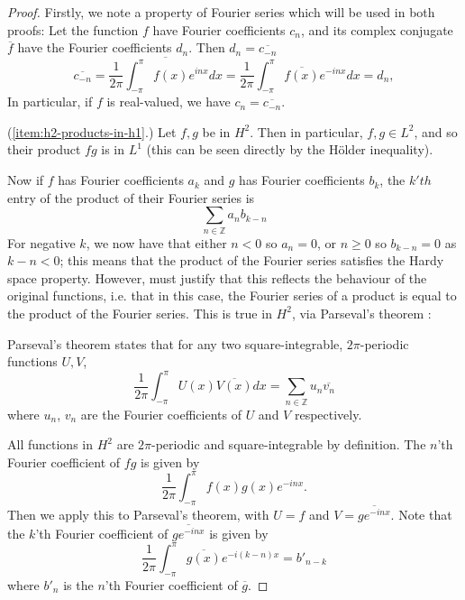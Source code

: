 \documentclass[../main.tex]{subfiles}
\begin{document}
\begin{proof}
  Firstly, we note a property of Fourier series which will be used in both proofs:
  Let the function $f$ have Fourier coefficients $c_n$, and its complex conjugate
  $\overline{f}$ have the Fourier coefficients $d_n$. Then $d_n = \overline{c_{-n}}$
  \begin{equation}
  \label{eqn:fourier-conjugates}
    \overline{c_{-n}} = \overline{\frac{1}{2\pi} \int_{-\pi}^{\pi}  f(x) e^{inx} dx} 
		    = \frac{1}{2\pi} \int_{-\pi}^{\pi} \overline{f(x)} e^{-inx} dx
        = d_n,
  \end{equation}
  In particular, if $f$ is real-valued, we have $c_n = \overline{c_{-n}}$.

  (\ref{item:h2-products-in-h1}.) Let $f, g$ be in $H^2$. Then in particular, $f,
  g \in L^2$, and so their product $fg$ is in $L^1$ (this can be seen
  directly by the H\"older inequality).

  Now if $f$ has Fourier coefficients $a_k$ and $g$ has Fourier coefficients $b_k$,
  the $k'th$ entry of the product of their Fourier series is
  \begin{equation}
  \label{eqn:prod-fourier-series}
    \sum_{n \in \mathbb{Z}} a_n b_{k-n}
  \end{equation}
  For negative $k$, 
  we now have that either $n < 0$ so $a_n = 0$, or $n \geq 0$ so $b_{k-n} = 0$
  as $k-n < 0$; this means that the product of the Fourier series satisfies
  the Hardy space property. However, must justify that this reflects the behaviour
  of the original functions, i.e. that in this case, the Fourier series of a product
  is equal to the product of the Fourier series. This is true in $H^2$, via
  Parseval's theorem \cite{halmos1982hilbert}:
  
  Parseval's theorem states that for any two square-integrable, $2\pi$-periodic functions $U, V$,
  $$\frac{1}{2\pi} \int_{-\pi}^{\pi} U(x)\overline{V(x)} dx = \sum_{n \in \mathbb{Z}}u_n \overline{v_n}$$
  where $u_n$, $v_n$ are the Fourier coefficients of $U$ and $V$ respectively.

  All functions in $H^2$ are $2\pi$-periodic and square-integrable by definition.
  The $n$'th Fourier coefficient of $fg$ is given by
  $$\frac{1}{2\pi} \int_{-\pi}^{\pi} f(x) g(x) e^{-inx}.$$
  Then we apply this to Parseval's theorem, with $U = f$ and $V = \overline{g e^{-inx}}$.
  Note that the $k$'th Fourier coefficient of $\overline{g e^{-inx}}$ is given by
  $$\frac{1}{2\pi} \int_{-\pi}^{\pi} \overline{g(x)} e^{-i(k-n)x} = b'_{n-k}$$
  where $b'_n$ is the $n$'th Fourier coefficient of $\overline{g}$.


\end{proof}
\end{document}
